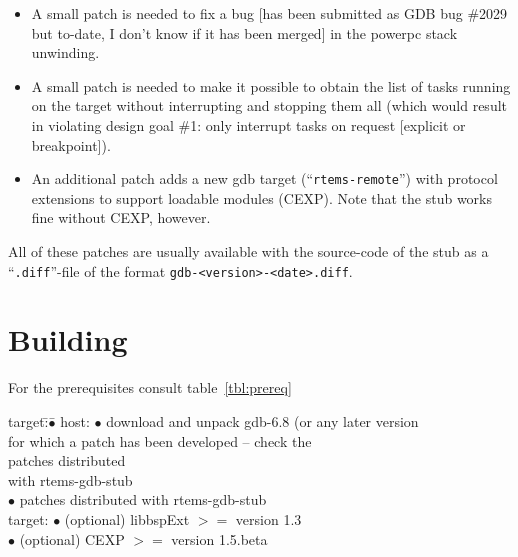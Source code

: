 \documentclass{article}
\newcommand{\cmd}[1]{{\tt #1}}
\newcommand{\bul}{$\bullet$\hspace{.5em}}
\begin{document}
\begin{itemize}
\item
 A small patch is needed to fix a bug [has been submitted
 as GDB bug \#2029
 but to-date, I don't know if it has been merged] in the
 powerpc stack unwinding.
\item
 A small patch is needed to make it possible to obtain
 the list of tasks running on the target without interrupting
 and stopping them all
 (which would result in violating design goal \#1: only
 interrupt tasks on request [explicit or breakpoint]).
\item
 An additional patch adds a new gdb target (``\cmd{rtems-remote}'')
 with protocol
 extensions to support loadable modules (CEXP). Note that
 the stub works fine without CEXP, however.
\end{itemize}

\noindent
All of these patches are usually available with the source-code
of the stub as a ``{\tt .diff}''-file of the format
{\tt gdb-<version>-<date>.diff}.

\section{Building}
For the prerequisites consult table~\ref{tbl:prereq}
\begin{table}
\begin{center}
\begin{tabbing}
target:\hspace{4em}\=\bul\= \kill
host:  \> \bul \> download and unpack gdb-6.8 (or any later version \\
       \>      \> for which a patch has been developed -- check the \\
	   \>      \>  patches distributed \\
	   \>      \> with rtems-gdb-stub \\
	   \> \bul \> patches distributed with rtems-gdb-stub \\
target:\> \bul \> (optional) libbspExt $>=$ version 1.3  \\
       \> \bul \> (optional) CEXP $>=$ version 1.5.beta
\end{tabbing}
\caption{Prerequisites}
\label{tbl:prereq}
\end{center}
\end{table}
\end{document}
